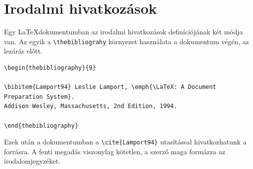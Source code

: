 \section{Irodalmi hivatkozások}\label{sect:HowtoReference}
Egy \LaTeX dokumentumban az irodalmi hivatkozások definíciójának két módja van. Az egyik a \verb+\thebibliograhy+ környezet használata a dokumentum végén, az \verb++ lezárás előtt.
\begin{lstlisting}[frame=single,float=!ht]
\begin{thebibliography}{9}

\bibitem{Lamport94} Leslie Lamport, \emph{\LaTeX: A Document Preparation System}. 
Addison Wesley, Massachusetts, 2nd Edition, 1994.

\end{thebibliography}
\end{lstlisting}

Ezek után a dokumentumban a \verb+\cite{Lamport94}+ utasítással hivatkozhatunk a forrásra. A fenti megadás viszonylag kötetlen, a szerző maga formázza az irodalomjegyzéket. 

